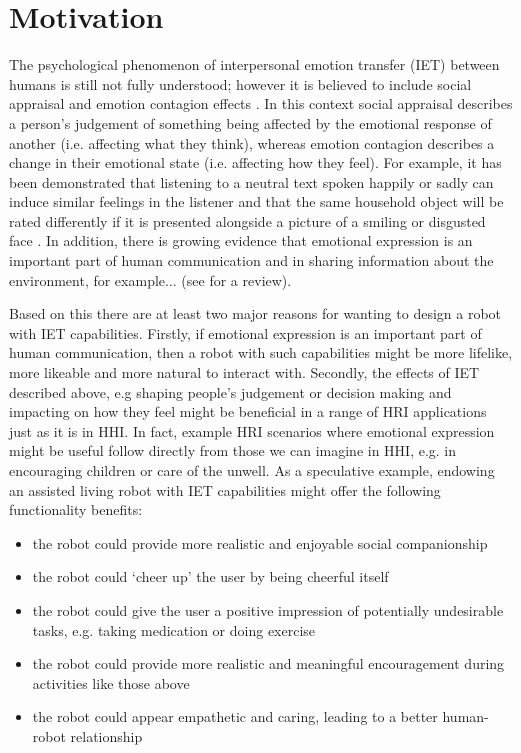 \documentclass[]{article}
\begin{document}
\section{Motivation}
The psychological phenomenon of interpersonal emotion transfer (IET) between humans is still not fully understood; however it is believed to include social appraisal and emotion contagion effects \cite{parkinson2011interpersonal}. In this context social appraisal describes a person's judgement of something being affected by the emotional response of another (i.e. affecting what they think), whereas emotion contagion describes a change in their emotional state (i.e. affecting how they feel). For example, it has been demonstrated that listening to a neutral text spoken happily or sadly can induce similar feelings in the listener \cite{neumann2000mood} and that the same household object will be rated differently if it is presented alongside a picture of a smiling or disgusted face \cite{bayliss2007affective}. In addition, there is growing evidence that emotional expression is an important part of human communication and in sharing information about the environment, for example... (see \cite{tracy2015nonverbal} for a review). 

Based on this there are at least two major reasons for wanting to design a robot with IET capabilities. Firstly, if emotional expression is an important part of human communication, then a robot with such capabilities might be more lifelike, more likeable and more natural to interact with. Secondly, the effects of IET described above, e.g shaping people's judgement or decision making and impacting on how they feel might be beneficial in a range of HRI applications just as it is in HHI. In fact, example HRI scenarios where emotional expression might be useful follow directly from those we can imagine in HHI, e.g. in encouraging children or care of the unwell. As a speculative example, endowing an assisted living robot with IET  capabilities might offer the following functionality benefits: 
\begin{itemize}
\item the robot could provide more realistic and enjoyable social companionship
\item the robot could `cheer up' the user by being cheerful itself
\item the robot could give the user a positive impression of potentially undesirable tasks, e.g. taking medication or doing exercise
\item the robot could provide more realistic and meaningful encouragement during activities like those above
\item the robot could appear empathetic and caring, leading to a better human-robot relationship
\end{itemize}
\end{document}
